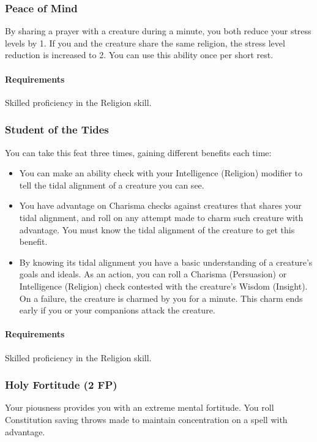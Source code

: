 \subsubsection{Peace of Mind} \label{feat::peaceofmind}
    By sharing a prayer with a creature during a minute, you both reduce your stress levels by 1.
    If you and the creature share the same religion, the stress level reduction is increased to 2.
    You can use this ability once per short rest.
    \paragraph{Requirements} Skilled proficiency in the Religion skill.
\subsubsection{Student of the Tides} \label{feat::studentofthetides}
    You can take this feat three times, gaining different benefits each time:
    \begin{itemize}
        \item You can make an ability check with your Intelligence (Religion) modifier to tell the tidal alignment of a creature you can see.
        \item You have advantage on Charisma checks against creatures that shares your tidal alignment, and roll on any attempt made to charm such creature with advantage.
        You must know the tidal alignment of the creature to get this benefit.
        \item By knowing its tidal alignment you have a basic understanding of a creature's goals and ideals.
        As an action, you can roll a Charisma (Persuasion) or Intelligence (Religion) check contested with the creature's Wisdom (Insight).
        On a failure, the creature is charmed by you for a minute.
        This charm ends early if you or your companions attack the creature.
    \end{itemize}
    \paragraph{Requirements} Skilled proficiency in the Religion skill.
\subsubsection{Holy Fortitude (2 FP)} \label{feat::holyfortitude}
    Your piousness provides you with an extreme mental fortitude.
    You roll Constitution saving throws made to maintain concentration on a spell with advantage.

